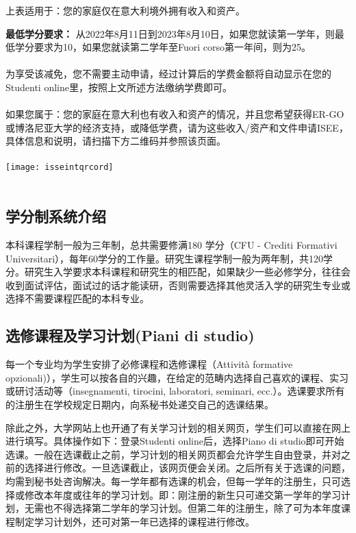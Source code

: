 上表适用于：您的家庭仅在意大利境外拥有收入和资产。


\textbf{最低学分要求：}
从2022年8月11日到2023年8月10日，如果您就读第一学年，则最低学分要求为10，如果您就读第二学年至Fuori corso第一年间，则为25。\\
\\
为享受该减免，您不需要主动申请，经过计算后的学费金额将自动显示在您的Studenti online里，按照上文所述方法缴纳学费即可。\\
\\
如果您属于：您的家庭在意大利也有收入和资产的情况，并且您希望获得ER-GO或博洛尼亚大学的经济支持，或降低学费，请为这些收入/资产和文件申请ISEE，具体信息和说明，请扫描下方二维码并参照该页面。\\
\\
\texttt{[image: isseintqrcord]}\\
\\

\subsection{学分制系统介绍}
本科课程学制一般为三年制，总共需要修满180 学分（CFU - Crediti Formativi Universitari），每年60学分的工作量。研究生课程学制一般为两年制，共120学分。研究生入学要求本科课程和研究生的相匹配，如果缺少一些必修学分，往往会收到面试评估，面试过的话才能读研，否则需要选择其他灵活入学的研究生专业或选择不需要课程匹配的本科专业。 

\subsection{选修课程及学习计划(Piani di studio)}
每一个专业均为学生安排了必修课程和选修课程（Attività formative opzionali)），学生可以按各自的兴趣，在给定的范畴内选择自己喜欢的课程、实习或研讨活动等（insegnamenti, tirocini, laboratori, seminari, ecc.）。选课要求所有的注册生在学校规定日期内，向系秘书处递交自己的选课结果。

除此之外，大学网站上也开通了有关学习计划的相关网页，学生们可以直接在网上进行填写。具体操作如下：登录Studenti online后，选择Piano di studio即可开始选课。一般在选课截止之前，学习计划的相关网页都会允许学生自由登录，并对之前的选择进行修改。一旦选课截止，该网页便会关闭。之后所有关于选课的问题，均需到秘书处咨询解决。每一学年都有选课的机会，但每一学年的注册生，只可选择或修改本年度或往年的学习计划。即：刚注册的新生只可递交第一学年的学习计划，无需也不得选择第二学年的学习计划。但第二年的注册生，除了可为本年度课程制定学习计划外，还可对第一年已选择的课程进行修改。

